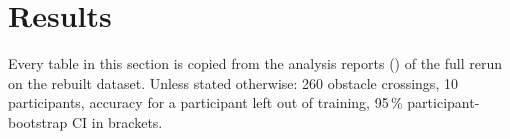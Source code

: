 \section{Results}
\label{sec:results}

Every table in this section is copied from the analysis reports () of the full
rerun on the rebuilt dataset. Unless stated otherwise: 260 obstacle crossings, 10 participants, accuracy for a participant
left out of training, 95\,\% participant-bootstrap CI in brackets.








